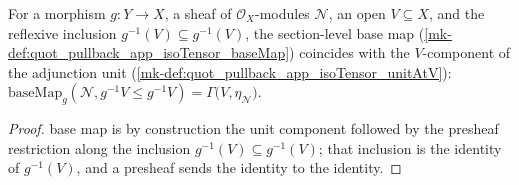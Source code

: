 \begin{lemma}
  \label{mk-lem:quot_baseMap_le_refl}
  \leanok

  For a morphism \(g : Y \to X\), a sheaf of \(\mathcal O_X\)-modules
  \(\mathcal N\), an open \(V \subseteq X\), and the reflexive inclusion
  \(g^{-1}(V) \subseteq g^{-1}(V)\), the section-level base map
  (\ref{mk-def:quot_pullback_app_isoTensor_baseMap}) coincides with the
  \(V\)-component of the adjunction unit
  (\ref{mk-def:quot_pullback_app_isoTensor_unitAtV}):
  \(\mathrm{baseMap}_g(\mathcal N, g^{-1}V \le g^{-1}V)
    = \Gamma\bigl(V, \eta_{\mathcal N}\bigr)\).
\end{lemma}
\begin{proof}
  \leanokThe base map is by construction the unit component followed by the
  presheaf restriction along the inclusion \(g^{-1}(V) \subseteq g^{-1}(V)\);
  that inclusion is the identity of \(g^{-1}(V)\), and a presheaf sends the
  identity to the identity.
\end{proof}

